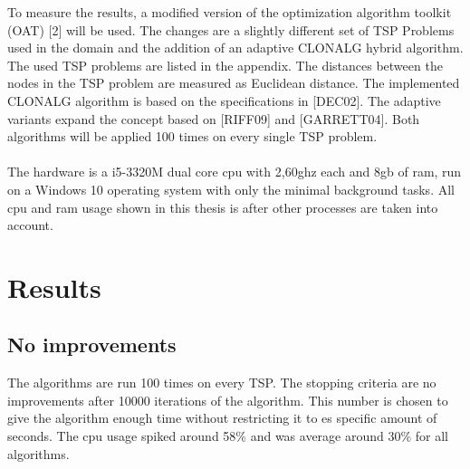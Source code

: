 To measure the results, a modified version of the optimization algorithm toolkit (OAT) [2] will be used. The changes are a slightly different set of TSP Problems used in the domain and the addition of an adaptive CLONALG hybrid algorithm. The used TSP problems are listed in the appendix. The distances between the nodes in the TSP problem are measured as Euclidean distance. The implemented CLONALG algorithm is based on the specifications in [DEC02]. The adaptive variants expand the concept based on [RIFF09] and [GARRETT04].
Both algorithms will be applied 100 times on every single TSP problem.\\\\
The hardware is a i5-3320M dual core cpu with 2,60ghz each and 8gb of ram, run on a Windows 10 operating system with only the minimal background tasks. All cpu and ram usage shown in this thesis is after other processes are taken into account.
\section{Results}
\subsection{No improvements}
The algorithms are run 100 times on every TSP. The stopping criteria are no improvements after 10000 iterations of the algorithm. This number is chosen to give the algorithm enough time without restricting it to es specific amount of seconds. The cpu usage spiked around 58\% and was average around 30\% for all algorithms.  